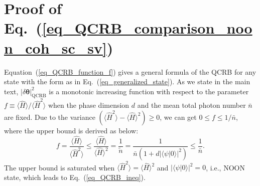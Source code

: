 \documentclass[aps,pra,reprint,showpacs,groupedaddress]{revtex4-1}
\begin{document}
\appendix

\section{Proof of Eq.~(\ref{eq_QCRB_comparison_noon_coh_sc_sv})}


Equation~(\ref{eq_QCRB_function_f}) gives a general formula of the QCRB for any state with the form as in Eq.~(\ref{eq_generalized_state}). As we state in the main text, $|\delta\boldsymbol{\theta}|_{\text{QCRB}}^2$ is a monotonic increasing function with respect to the parameter $f \equiv \langle\hat{H}\rangle/\langle \hat{H}^2 \rangle$ when the phase dimension $d$ and the mean total photon number $\bar{n}$ are fixed. Due to the variance $(\langle \hat{H}^2 \rangle - \langle\hat{H}\rangle^2) \geq 0$, we can get $0 \leq f \leq 1/\bar{n}$, where the upper bound is derived as below:
\begin{equation}
    f
    =
    \frac{\langle\hat{H}\rangle}{\langle \hat{H}^2 \rangle}
    \leq
    \frac{\langle\hat{H}\rangle}{\langle \hat{H}\rangle^2} = \frac{1}{\tilde{n}} = \frac{1}{\bar{n}(1+d|\langle \psi|0\rangle|^2)}
    \leq
    \frac{1}{\bar{n}}.
\label{f}
\end{equation}
The upper bound is saturated when $\langle \hat{H}^2 \rangle = \langle \hat{H}\rangle^2$ and $|\langle \psi|0\rangle|^2=0$, i.e., NOON state, which leads to Eq.~(\ref{eq_QCRB_ineq}).
\end{document}
